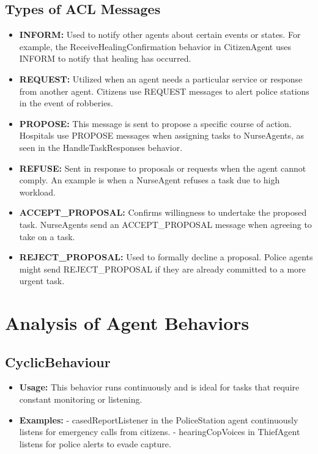 \documentclass[conference]{IEEEtran}
\begin{document}
\subsection{Types of ACL Messages}
\begin{itemize}
\item \textbf{INFORM:} Used to notify other agents about certain events or states. For example, the ReceiveHealingConfirmation behavior in CitizenAgent uses INFORM to notify that healing has occurred.

\item \textbf{REQUEST:} Utilized when an agent needs a particular service or response from another agent. Citizens use REQUEST messages to alert police stations in the event of robberies.

\item \textbf{PROPOSE:} This message is sent to propose a specific course of action. Hospitals use PROPOSE messages when assigning tasks to NurseAgents, as seen in the HandleTaskResponses behavior.

\item \textbf{REFUSE:} Sent in response to proposals or requests when the agent cannot comply. An example is when a NurseAgent refuses a task due to high workload.

\item \textbf{ACCEPT\_PROPOSAL:} Confirms willingness to undertake the proposed task. NurseAgents send an ACCEPT\_PROPOSAL message when agreeing to take on a task.

\item \textbf{REJECT\_PROPOSAL:} Used to formally decline a proposal. Police agents might send REJECT\_PROPOSAL if they are already committed to a more urgent task.
\end{itemize}

\section{Analysis of Agent Behaviors}


\subsection{CyclicBehaviour}
\begin{itemize}
\item \textbf{Usage:} This behavior runs continuously and is ideal for tasks that require constant monitoring or listening.
\item \textbf{Examples:}
- casedReportListener in the PoliceStation agent continuously listens for emergency calls from citizens.
- hearingCopVoices in ThiefAgent listens for police alerts to evade capture.
\end{itemize}
\end{document}
